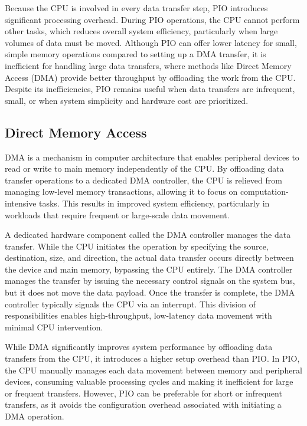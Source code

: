Because the CPU is involved in every data transfer step, PIO introduces significant processing overhead. During PIO operations, the CPU cannot perform other tasks, which reduces overall system efficiency, particularly when large volumes of data must be moved. Although PIO can offer lower latency for small, simple memory operations compared to setting up a DMA transfer, it is inefficient for handling large data transfers, where methods like Direct Memory Access (DMA) provide better throughput by offloading the work from the CPU. Despite its inefficiencies, PIO remains useful when data transfers are infrequent, small, or when system simplicity and hardware cost are prioritized.

\subsection{Direct Memory Access}

DMA is a mechanism in computer architecture that enables peripheral devices to read or write to main memory independently of the CPU. By offloading data transfer operations to a dedicated DMA controller, the CPU is relieved from managing low-level memory transactions, allowing it to focus on computation-intensive tasks. This results in improved system efficiency, particularly in workloads that require frequent or large-scale data movement.

A dedicated hardware component called the DMA controller manages the data transfer. While the CPU initiates the operation by specifying the source, destination, size, and direction, the actual data transfer occurs directly between the device and main memory, bypassing the CPU entirely. The DMA controller manages the transfer by issuing the necessary control signals on the system bus, but it does not move the data payload. Once the transfer is complete, the DMA controller typically signals the CPU via an interrupt. This division of responsibilities enables high-throughput, low-latency data movement with minimal CPU intervention.

While DMA significantly improves system performance by offloading data transfers from the CPU, it introduces a higher setup overhead than PIO. In PIO, the CPU manually manages each data movement between memory and peripheral devices, consuming valuable processing cycles and making it inefficient for large or frequent transfers. However, PIO can be preferable for short or infrequent transfers, as it avoids the configuration overhead associated with initiating a DMA operation.


